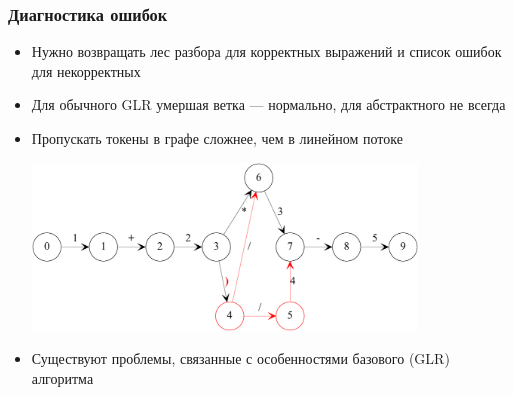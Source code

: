 \documentclass{beamer}
\begin{document}
\begin{frame}[fragile]
	\transwipe[direction=90]
	\frametitle{Диагностика ошибок}
    \begin{itemize}
    	\item Нужно возвращать лес разбора для корректных выражений и список ошибок для некорректных
        \item Для обычного GLR умершая ветка — нормально, для абстрактного не всегда
        \item Пропускать токены в графе сложнее, чем в линейном потоке
	        \begin{center}
	            \includegraphics[width=290pt]{picts/IgnoringPaths.pdf}
	        \end{center}
        \item Существуют проблемы, связанные с особенностями базового (GLR) алгоритма
	\end{itemize}
\end{frame}
\end{document}
